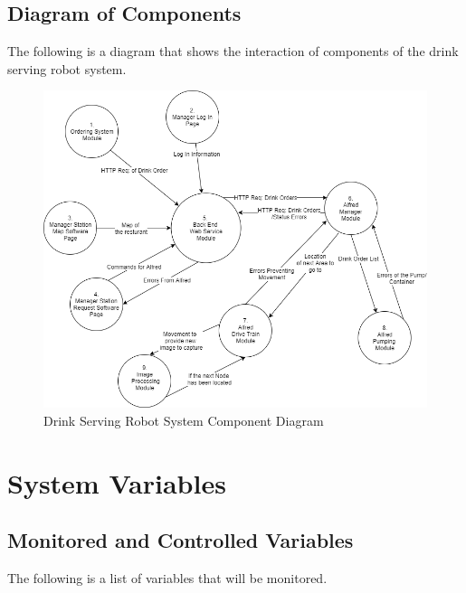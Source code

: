 \documentclass [10pt]{article}
\begin{document}

\subsection{Diagram of Components}
The following is a diagram that shows the interaction of components of the drink serving robot system.
\begin{figure} [h!]
	\centering
	\includegraphics [scale = 0.6] {Figures/SystemComponents.png}
	\caption{Drink Serving Robot System Component Diagram}
\end{figure}



\section{System Variables}


\subsection{Monitored and Controlled Variables}
The following is a list of variables that will be monitored. \\
\end{document}
